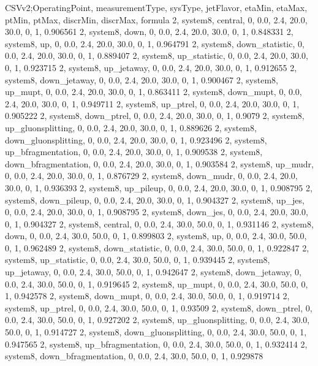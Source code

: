 CSVv2;OperatingPoint, measurementType, sysType, jetFlavor, etaMin, etaMax, ptMin, ptMax, discrMin, discrMax, formula
2, system8, central,    0, 0.0, 2.4, 20.0, 30.0, 0, 1, 0.906561
2, system8, down,       0, 0.0, 2.4, 20.0, 30.0, 0, 1, 0.848331
2, system8, up,         0, 0.0, 2.4, 20.0, 30.0, 0, 1, 0.964791
2, system8, down_statistic,       0, 0.0, 2.4, 20.0, 30.0, 0, 1, 0.889407
2, system8, up_statistic,         0, 0.0, 2.4, 20.0, 30.0, 0, 1, 0.923715
2, system8, up_jetaway,      0, 0.0, 2.4, 20.0, 30.0, 0, 1, 0.912655
2, system8, down_jetaway,    0, 0.0, 2.4, 20.0, 30.0, 0, 1, 0.900467
2, system8, up_mupt,         0, 0.0, 2.4, 20.0, 30.0, 0, 1, 0.863411
2, system8, down_mupt,       0, 0.0, 2.4, 20.0, 30.0, 0, 1, 0.949711
2, system8, up_ptrel,        0, 0.0, 2.4, 20.0, 30.0, 0, 1, 0.905222
2, system8, down_ptrel,      0, 0.0, 2.4, 20.0, 30.0, 0, 1, 0.9079
2, system8, up_gluonsplitting, 0, 0.0, 2.4, 20.0, 30.0, 0, 1, 0.889626
2, system8, down_gluonsplitting, 0, 0.0, 2.4, 20.0, 30.0, 0, 1, 0.923496
2, system8, up_bfragmentation, 0, 0.0, 2.4, 20.0, 30.0, 0, 1, 0.909538
2, system8, down_bfragmentation, 0, 0.0, 2.4, 20.0, 30.0, 0, 1, 0.903584
2, system8, up_mudr,         0, 0.0, 2.4, 20.0, 30.0, 0, 1, 0.876729
2, system8, down_mudr,       0, 0.0, 2.4, 20.0, 30.0, 0, 1, 0.936393
2, system8, up_pileup,       0, 0.0, 2.4, 20.0, 30.0, 0, 1, 0.908795
2, system8, down_pileup,     0, 0.0, 2.4, 20.0, 30.0, 0, 1, 0.904327
2, system8, up_jes,          0, 0.0, 2.4, 20.0, 30.0, 0, 1, 0.908795
2, system8, down_jes,        0, 0.0, 2.4, 20.0, 30.0, 0, 1, 0.904327
2, system8, central,    0, 0.0, 2.4, 30.0, 50.0, 0, 1, 0.931146
2, system8, down,       0, 0.0, 2.4, 30.0, 50.0, 0, 1, 0.899803
2, system8, up,         0, 0.0, 2.4, 30.0, 50.0, 0, 1, 0.962489
2, system8, down_statistic,       0, 0.0, 2.4, 30.0, 50.0, 0, 1, 0.922847
2, system8, up_statistic,         0, 0.0, 2.4, 30.0, 50.0, 0, 1, 0.939445
2, system8, up_jetaway,      0, 0.0, 2.4, 30.0, 50.0, 0, 1, 0.942647
2, system8, down_jetaway,    0, 0.0, 2.4, 30.0, 50.0, 0, 1, 0.919645
2, system8, up_mupt,         0, 0.0, 2.4, 30.0, 50.0, 0, 1, 0.942578
2, system8, down_mupt,       0, 0.0, 2.4, 30.0, 50.0, 0, 1, 0.919714
2, system8, up_ptrel,        0, 0.0, 2.4, 30.0, 50.0, 0, 1, 0.93509
2, system8, down_ptrel,      0, 0.0, 2.4, 30.0, 50.0, 0, 1, 0.927202
2, system8, up_gluonsplitting, 0, 0.0, 2.4, 30.0, 50.0, 0, 1, 0.914727
2, system8, down_gluonsplitting, 0, 0.0, 2.4, 30.0, 50.0, 0, 1, 0.947565
2, system8, up_bfragmentation, 0, 0.0, 2.4, 30.0, 50.0, 0, 1, 0.932414
2, system8, down_bfragmentation, 0, 0.0, 2.4, 30.0, 50.0, 0, 1, 0.929878
